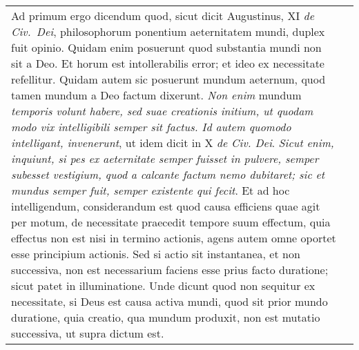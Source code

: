 \documentclass[10pt]{jsarticle} %
\begin{document}
\begin{longtable}{p{21em}p{21em}}
{\sc Ad primum ergo dicendum quod}, sicut dicit Augustinus, XI {\it de
 Civ.~Dei}, philosophorum ponentium aeternitatem mundi, duplex fuit
 opinio. Quidam enim posuerunt quod substantia mundi non sit a Deo. Et
 horum est intollerabilis error; et ideo ex necessitate
 refellitur.
Quidam autem sic posuerunt mundum aeternum, quod tamen
 mundum a Deo factum dixerunt. {\it Non enim} mundum {\it temporis
 volunt habere, sed suae creationis initium, ut quodam modo vix
 intelligibili semper sit factus. Id autem quomodo intelligant,
 invenerunt}, ut idem dicit in X {\it de Civ. Dei}. {\it Sicut enim,
 inquiunt, si pes ex aeternitate semper fuisset in pulvere,
semper
 subesset vestigium, quod a calcante
factum nemo dubitaret; sic et
 mundus semper fuit, semper existente qui fecit}. Et ad hoc
 intelligendum, considerandum est quod causa efficiens quae agit per
 motum, de necessitate praecedit tempore suum effectum, quia effectus
 non est nisi in termino actionis, agens autem omne oportet esse
 principium actionis. Sed si actio sit instantanea, et non successiva,
 non est necessarium faciens esse prius facto duratione; sicut patet in
 illuminatione. Unde dicunt quod non sequitur ex necessitate, si Deus
 est causa activa mundi, quod sit prior mundo duratione, quia creatio,
 qua mundum produxit, non est mutatio successiva, ut supra dictum est.

&


\end{longtable}
\end{document}
